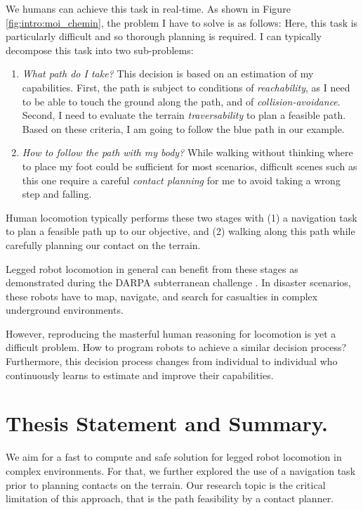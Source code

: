 We humans can achieve this task in real-time. 
As shown in Figure \ref{fig:intro:moi_chemin}, the problem I have to solve is as follows: 
Here, this task is particularly difficult and so thorough planning is required.
I can typically decompose this task into two sub-problems:
\begin{enumerate}
    \item \textit{What path do I take?} 
    This decision is based on an estimation of my capabilities. 
    First, the path is subject to conditions of \textit{reachability}, as I need to be able to touch the ground along the path, and of \textit{collision-avoidance}. 
    Second, I need to evaluate the terrain \textit{traversability} to plan a feasible path. Based on these criteria, I am going to follow the blue path in our example.
    \item \textit{How to follow the path with my body?} 
    While walking without thinking where to place my foot could be sufficient for most scenarios, difficult scenes such as this one require a careful \textit{contact planning} for me to avoid taking a wrong step and falling.
\end{enumerate}
Human locomotion typically performs these two stages with (1) a navigation task to plan a feasible path up to our objective, and (2) walking along this path while carefully planning our contact on the terrain.

Legged robot locomotion in general can benefit from these stages as demonstrated during the DARPA subterranean challenge \cite{darpa_nasa_2021, darpa_hutter_2022}.
In disaster scenarios, these robots have to map, navigate, and search for casualties in complex underground environments.

However, reproducing the masterful human reasoning for locomotion is yet a difficult problem. How to program robots to achieve a similar decision process?
Furthermore, this decision process changes from individual to individual who continuously learns to estimate and improve their capabilities.



\section{Thesis Statement and Summary.}

We aim for a fast to compute and safe solution for legged robot locomotion in complex environments.
For that, we further explored the use of a navigation task prior to planning contacts on the terrain.
Our research topic is the critical limitation of this approach, that is the path feasibility by a contact planner.

